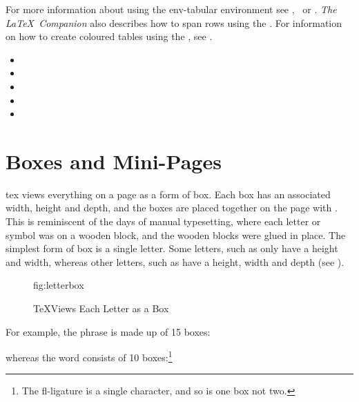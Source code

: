 For more information about using the \gls{env-tabular} environment see \latexbook,
\latexguide\ or \latexcomp.  \emph{The \LaTeX\ Companion} also describes how
to span rows using the 
.  For information on how to create
coloured tables using the 
, see \latexgraphic.

\begin{itemize}
\item {}
\item {}
\item {}
\item {}
\item {}
\end{itemize}


\section{Boxes and Mini-Pages}
\label{sec:boxes}

\gls{tex} views everything on a page as a form of box. Each box has an
associated width, height and depth, and the boxes are placed together
on the page with . This is reminiscent of the days
of manual typesetting, where each letter or symbol was on a wooden
block, and the wooden blocks were glued in place. The simplest form
of box is a single letter. Some letters, such as  only have a
height and width, whereas other letters, such as  have a
height, width and depth (see ).

\begin{figure}[htbp]
%
  {%
    \caption{\texorpdfstring{\protect\TeX}{TeX}\protect\space Views Each Letter as a Box}%
  }%
  {fig:letterbox}%
\end{figure}

For example, the phrase  is made up of 15 boxes:
\begin{center}
\end{center}
whereas the word  consists of 10 boxes:\footnote{The 
fl-ligature is a single character, and so is one box not
two.}
\begin{center}
\end{center}

